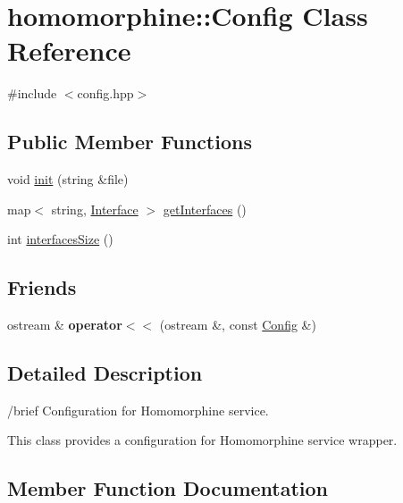 \hypertarget{classhomomorphine_1_1_config}{}\section{homomorphine\+:\+:Config Class Reference}
\label{classhomomorphine_1_1_config}


{\ttfamily \#include $<$config.\+hpp$>$}

\subsection*{Public Member Functions}
\begin{DoxyCompactItemize}
\item 
void \hyperlink{classhomomorphine_1_1_config_ae3df94f615e3bc738525626875715a92}{init} (string \&file)
\item 
map$<$ string, \hyperlink{classhomomorphine_1_1_interface}{Interface} $>$ \hyperlink{classhomomorphine_1_1_config_a9286b3174aa24eddfe209fbe35fce303}{get\+Interfaces} ()
\item 
int \hyperlink{classhomomorphine_1_1_config_a48768be288a3e95be68488c02ce19601}{interfaces\+Size} ()
\end{DoxyCompactItemize}
\subsection*{Friends}
\begin{DoxyCompactItemize}
\item 
\mbox{\label{classhomomorphine_1_1_config_ad47f2707e919427dd6f15ccf25608b32}} 
ostream \& {\bfseries operator$<$$<$} (ostream \&, const \hyperlink{classhomomorphine_1_1_config}{Config} \&)
\end{DoxyCompactItemize}


\subsection{Detailed Description}
/brief Configuration for Homomorphine service.

This class provides a configuration for Homomorphine service wrapper. 

\subsection{Member Function Documentation}
\mbox{\label{classhomomorphine_1_1_config_a9286b3174aa24eddfe209fbe35fce303}} 
